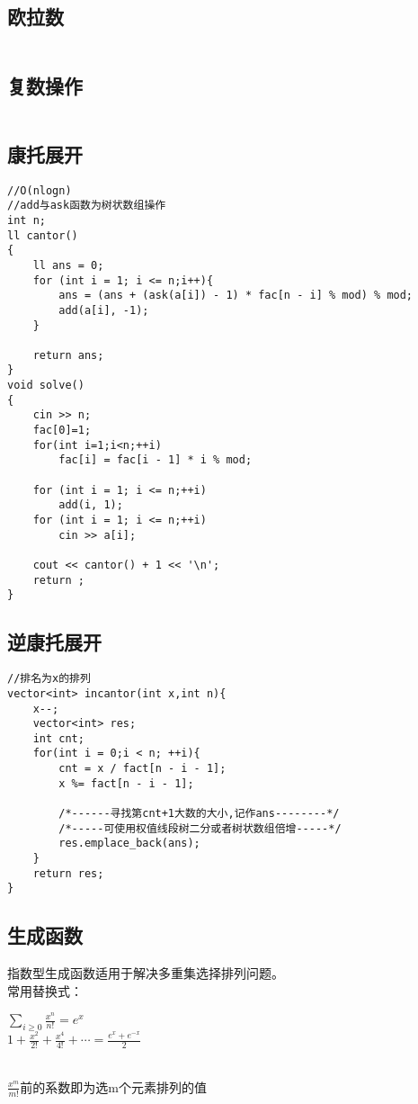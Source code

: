 \documentclass[twocolumn,a4]{article}
\begin{document}
\subsection{欧拉数}
\begin{lstlisting}

\end{lstlisting}

\subsection{复数操作}
\begin{lstlisting}

\end{lstlisting}

\subsection{康托展开}
\begin{lstlisting}
//O(nlogn)
//add与ask函数为树状数组操作
int n;
ll cantor()
{
    ll ans = 0;
    for (int i = 1; i <= n;i++){
        ans = (ans + (ask(a[i]) - 1) * fac[n - i] % mod) % mod;
        add(a[i], -1);
    }

    return ans;
}
void solve()
{
    cin >> n;
    fac[0]=1;
    for(int i=1;i<n;++i)
        fac[i] = fac[i - 1] * i % mod;

    for (int i = 1; i <= n;++i)
        add(i, 1);
    for (int i = 1; i <= n;++i)
        cin >> a[i];
        
    cout << cantor() + 1 << '\n';
    return ;
}

\end{lstlisting}

\subsection{逆康托展开}
\begin{lstlisting}
//排名为x的排列
vector<int> incantor(int x,int n){
    x--;
    vector<int> res; 
    int cnt;
    for(int i = 0;i < n; ++i){
        cnt = x / fact[n - i - 1]; 
        x %= fact[n - i - 1];
        
        /*------寻找第cnt+1大数的大小,记作ans--------*/
        /*-----可使用权值线段树二分或者树状数组倍增-----*/
        res.emplace_back(ans);
    }
    return res;
}

\end{lstlisting}
\subsection{生成函数}
指数型生成函数适用于解决多重集选择排列问题。\\
常用替换式：\\
\begin{LARGE}
    $\sum_{i\geq 0} \frac{x^{n}}{n!}=e^{x}$\\
    $1+\frac{x^{2}}{2!}+\frac{x^{4}}{4!}+\cdots =\frac{e^{x}+e^{-x}}{2}$\\
\end{LARGE}
\\
$\frac{x^{m}}{m!}$前的系数即为选m个元素排列的值
\end{document}
